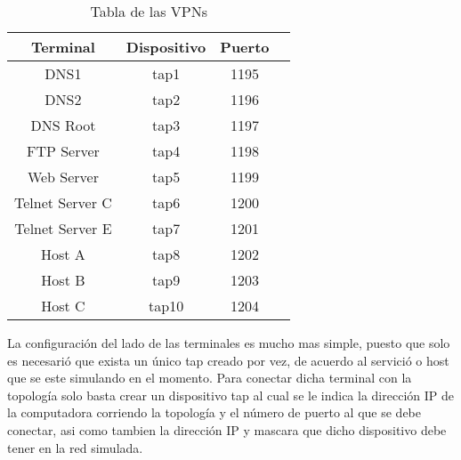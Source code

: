 \begin{table}[!htbp]
	\centering
	\begin{tabular}{|c|c|c|c|}
	\hline
	Terminal & Dispositivo & Puerto \\	
	\hline
	DNS1 & tap1 & 1195 \\
	\hline
	DNS2 & tap2 & 1196 \\
	\hline
	DNS Root & tap3 & 1197 \\
	\hline
	FTP Server & tap4 & 1198 \\
	\hline
	Web Server & tap5 & 1199 \\
	\hline
	Telnet Server C & tap6 & 1200 \\
	\hline
	Telnet Server E & tap7 & 1201 \\
	\hline
	Host A & tap8 & 1202 \\
	\hline
	Host B & tap9 & 1203 \\
	\hline
	Host C & tap10 & 1204 \\
	\hline
	\end{tabular}
	\caption{Tabla de las VPNs}
	\label{tab063}
\end{table}

La configuración del lado de las terminales es mucho mas simple, puesto que solo es necesarió que
exista un único tap creado por vez, de acuerdo al servició o host que se este simulando en el 
momento. Para conectar dicha terminal con la topología solo basta crear un dispositivo tap al 
cual se le indica la dirección IP de la computadora corriendo la topología y el número de puerto 
al que se debe conectar, asi como tambien la dirección IP y mascara que dicho dispositivo debe
tener en la red simulada.
